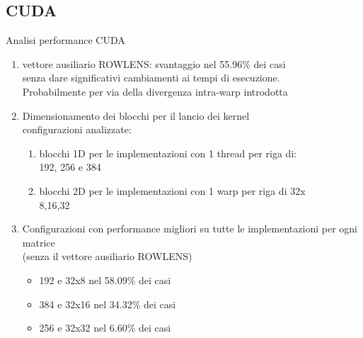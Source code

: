 \documentclass[aspectratio=1610]{beamer}
\begin{document}
\subsection{CUDA}
\begin{frame}{Analisi performance CUDA}
	\begin{enumerate}
		\item	vettore ausiliario ROWLENS: svantaggio nel 55.96\% dei casi\\
				senza dare significativi cambiamenti ai tempi di esecuzione.\\
				Probabilmente per via della divergenza intra-warp introdotta 
		\pause
		\item	Dimensionamento dei blocchi per il lancio dei kernel\\
				configurazioni analizzate:
		\pause
		\begin{enumerate}
			\item	blocchi 1D per le implementazioni con 1 thread per riga di:\\192, 256 e 384
			\item	blocchi 2D per le implementazioni con 1 warp per riga di 32x\\8,16,32
		\end{enumerate}
		\item	Configurazioni con performance migliori su 
				tutte le implementazioni per ogni matrice\\
				(senza il vettore ausiliario ROWLENS)
		\pause
		\begin{itemize}
			\item 192 e 32x8  nel 58.09\% dei casi
			\item 384 e 32x16 nel 34.32\% dei casi
			\item 256 e 32x32 nel  6.60\% dei casi
		\end{itemize}
	\end{enumerate}
\end{frame}
\end{document}
